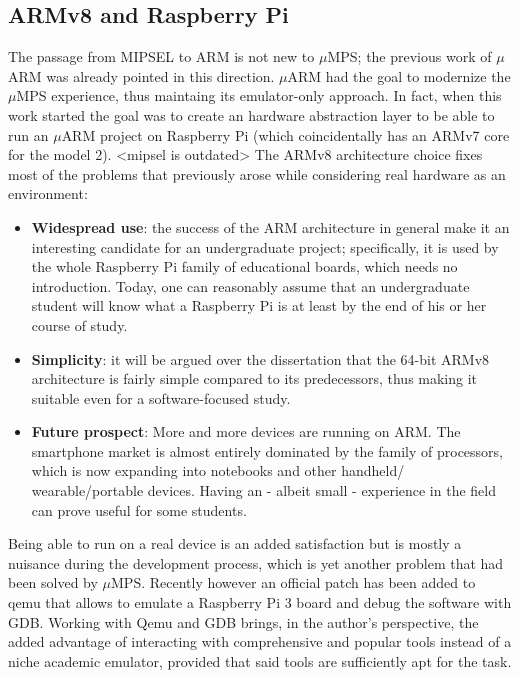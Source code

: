 \documentclass[12pt,a4paper,openright,twoside]{report}
\begin{document}
\subsection{ARMv8 and Raspberry Pi}
The passage from MIPSEL to ARM is not new to $\mu$MPS; the previous work
of $\mu$ARM was already pointed in this direction. $\mu$ARM had the goal to
modernize the $\mu$MPS experience, thus maintaing its emulator-only approach.
In fact, when this work started the goal was to create an hardware abstraction
layer to be able to run an $\mu$ARM project on Raspberry Pi (which 
coincidentally has an ARMv7 core for the model 2).
<mipsel is outdated>
The ARMv8 architecture choice fixes most of the problems that previously arose while
considering real hardware as an environment:
\begin{itemize}
    \item \textbf{Widespread use}: the success of the ARM architecture in general
            make it an interesting candidate for an undergraduate project; specifically,
            it is used by the whole Raspberry Pi family of educational boards, which
            needs no introduction. Today, one can reasonably assume that an undergraduate
            student will know what a Raspberry Pi is at least by the end of his or her
            course of study.
    \item \textbf{Simplicity}: it will be argued over the dissertation that the
            64-bit ARMv8 architecture is fairly simple compared to its predecessors,
            thus making it suitable even for a software-focused study.
    \item \textbf{Future prospect}: More and more devices are running on ARM.
            The smartphone market is almost entirely dominated by the family of
            processors, which is now expanding into notebooks and other handheld/
            wearable/portable devices.
            Having an - albeit small - experience in the field can prove useful
            for some students.
\end{itemize}
Being able to run on a real device is an added satisfaction but is mostly a 
nuisance during the development process, which is yet another problem that 
had been solved by $\mu$MPS. Recently however an official patch has been
added to qemu that allows to emulate a Raspberry Pi 3 board and debug the software
with GDB. Working with Qemu and GDB brings, in the author's perspective, the
added advantage of interacting with comprehensive and popular tools instead of 
a niche academic emulator, provided that said tools are sufficiently apt for
the task. 
\end{document}
